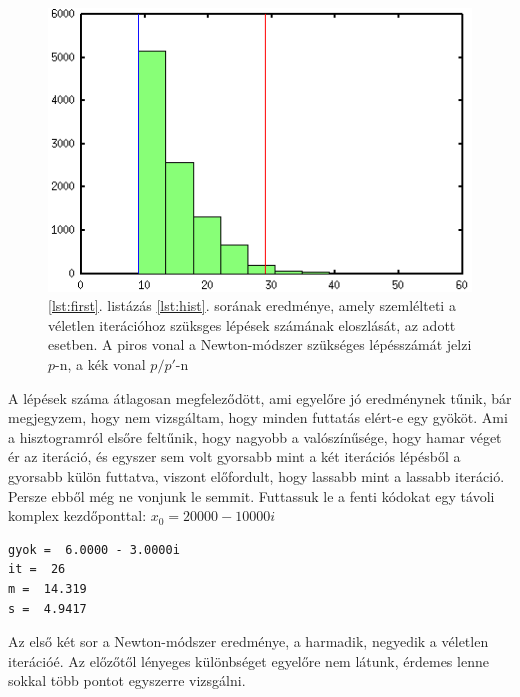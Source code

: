 \documentclass[a4paper,12pt]{report}
\begin{document}
				\begin{figure}[h]
					\centering
					\includegraphics[scale=0.65]{hist.png}
					\caption{\ref{lst:first}. listázás \ref{lst:hist}. sorának eredménye, amely szemlélteti a véletlen iterációhoz szüksges lépések számának eloszlását, az adott esetben. A piros vonal a Newton-módszer szükséges lépésszámát jelzi $p$-n, a kék vonal $p/p'$-n}\label{k11}
				\end{figure}
				
A lépések száma átlagosan megfeleződött, ami egyelőre jó eredménynek tűnik, bár megjegyzem, hogy nem vizsgáltam, hogy minden futtatás elért-e egy gyököt. Ami a hisztogramról elsőre feltűnik, hogy nagyobb a valószínűsége, hogy hamar véget ér az iteráció, és egyszer sem volt gyorsabb mint a két iterációs lépésből a gyorsabb külön futtatva, viszont előfordult, hogy lassabb mint a lassabb iteráció. Persze ebből még ne vonjunk le semmit. Futtassuk le a fenti kódokat egy távoli komplex kezdőponttal: $x_0=20000-10000i$
				\begin{singlespace}
                \begin{lstlisting}[caption=Eredmény]
gyok =  6.0000 - 3.0000i
it =  26
m =  14.319
s =  4.9417
				\end{lstlisting}
                \end{singlespace}
				Az első két sor a Newton-módszer eredménye, a harmadik, negyedik a véletlen iterációé. Az előzőtől lényeges különbséget egyelőre nem látunk, érdemes lenne sokkal több pontot egyszerre vizsgálni. 
\end{document}
